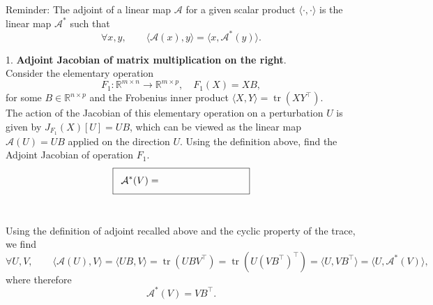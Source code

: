 \documentclass{article}
\theoremstyle{definition}
\theoremstyle{remark}
\begin{document}
\begin{boxA}
    Reminder: The adjoint of a linear map $\mathcal{A}$ for a given scalar product
    $\langle \cdot, \cdot \rangle$ is the linear map $\mathcal{A}^*$ such that
    \[
        \forall x,y, \qquad
        \langle \mathcal{A}(x), y \rangle
        =
        \langle x, \mathcal{A}^*(y) \rangle.
    \]
\end{boxA}\vspace{0.3cm}

1. \textbf{Adjoint Jacobian of matrix multiplication on the right}. \vspace{0.2cm}\\
Consider the elementary operation 
\[F_1: \mathbb{R}^{m \times n} \rightarrow \mathbb{R}^{m \times p}, \quad F_1(X) = XB,\]
for some $B\in \mathbb{R}^{n \times p}$ and the Frobenius inner product $\langle X, Y\rangle = \operatorname{tr}(XY^\top)$. \vspace{0.2cm}\\
The action of the Jacobian of this elementary operation on a perturbation
$U$ is given by $J_{F_1}(X)[U] = UB$,
which can be viewed as the linear map
$\mathcal{A}(U)=UB$ applied on the direction $U$. Using the definition above, find the Adjoint  Jacobian of operation $F_1$. \vspace{0.2cm}\\
\[
\setlength{\fboxsep}{8pt}
\fbox{$\displaystyle \mathcal{A}^*(V) = \hspace{3cm}$}
\] \\
\begin{solution}
Using the definition of adjoint recalled above and the cyclic property of the trace, we find
\[
    \forall U, V, \qquad \langle \mathcal{A}(U), V \rangle = \langle UB, V \rangle = \operatorname{tr}(UBV^\top) = \operatorname{tr}(U(VB^\top)^\top) = \langle U, VB^\top \rangle = \langle U, \mathcal{A}^*(V) \rangle, 
\]
where therefore
\[
    \mathcal{A}^*(V)=VB^\top.
\]
\end{solution}
\end{document}
